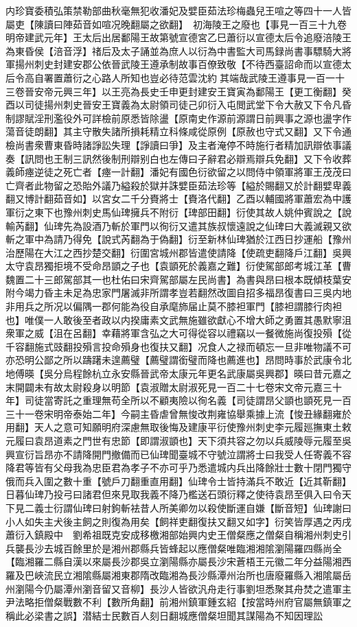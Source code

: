 内珍寶委積弘策禁勒部曲秋毫無犯收潘妃及嬖臣茹法珍梅蟲兒王喧之等四十一人皆屬吏【陳讀曰陣茹音如喧况晚翻屬之欲翻】　初海陵王之廢也【事見一百三十九卷明帝建武元年】王太后出居鄱陽王故第號宣德宮乙巳蕭衍以宣德太后令追廢涪陵王為東昏侯【涪音浮】禇后及太子誦並為庶人以衍為中書監大司馬録尚書事驃騎大將軍揚州刺史封建安郡公依晉武陵王遵承制故事百僚致敬【不待西臺詔命而以宣德太后令高自署置蕭衍之心路人所知也豈必待范雲沈約其端哉武陵王遵事見一百一十三卷晉安帝元興三年】以王亮為長史壬申更封建安王寶寅為鄱陽王【更工衡翻】癸酉以司徒揚州刺史晉安王寶義為太尉領司徒己卯衍入屯閲武堂下令大赦又下令凡昏制謬賦淫刑濫役外可詳檢前原悉皆除盪【原南史作源前源謂日前興事之源也盪字作蕩音徒朗翻】其主守散失諸所損耗精立科條咸從原例【原赦也守式又翻】又下令通檢尚書衆曹東昏時諸諍訟失理【諍讀曰爭】及主者淹停不時施行者精加訊辯依事議奏【訊問也王制三訊然後制刑辯别白也左傳曰子辭君必辯焉辯兵免翻】又下令收葬義師瘞逆徒之死亡者【瘞一計翻】潘妃有國色衍欲留之以問侍中領軍將軍王茂茂曰亡齊者此物留之恐貽外議乃縊殺於獄并誅嬖臣茹法珍等【縊於賜翻又於計翻嬖卑義翻又博計翻茹音如】以宮女二千分賚將士【賚洛代翻】乙酉以輔國將軍蕭宏為中護軍衍之東下也豫州刺史馬仙琕擁兵不附衍【琕部田翻】衍使其故人姚仲賓說之【說輸芮翻】仙琕先為設酒乃斬於軍門以徇衍又遣其族叔懷遠說之仙琕曰大義滅親又欲斬之軍中為請乃得免【說式芮翻為于偽翻】衍至新林仙琕猶於江西日抄運船【豫州治歷陽在大江之西抄楚交翻】衍圍宮城州郡皆遣使請降【使疏吏翻降戶江翻】吳興太守袁昂獨拒境不受命昂顗之子也【袁顗死於義嘉之難】衍使駕部郎考城江革【曹魏置二十三郎駕部其一也杜佑曰宋齊駕部屬左民尚書】為書與昂曰根本既傾枝葉安附今竭力昏主未足為忠家門屠滅非所謂孝豈若翻然改圖自招多福昂復書曰三吳内地非用兵之所况以偏隅一郡何能為役自承麾斾届止莫不膝袒軍門【膝袒謂膝行肉袒也】唯僕一人敢後至者政以内揆庸素文武無施雖欲獻心不增大師之勇置其愚默寧沮衆軍之威【沮在呂翻】幸藉將軍含弘之大可得從容以禮竊以一餐微施尚復投殞【從千容翻施式豉翻投殞言投命殞身也復扶又翻】况食人之禄而頓忘一旦非唯物議不可亦恐明公鄙之所以躊躇未遑薦璧【薦璧謂銜璧而降也薦進也】昂問時事於武康令北地傅暎【吳分烏程餘杭立永安縣晉武帝太康元年更名武康屬吳興郡】暎曰昔元嘉之末開闢未有故太尉殺身以明節【袁淑贈太尉淑死見一百二十七卷宋文帝元嘉三十年】司徒當寄託之重理無苟全所以不顧夷險以徇名義【司徒謂昂父顗也顗死見一百三十一卷宋明帝泰始二年】今嗣主昏虐曾無悛改荆雍協舉乘據上流【悛丑緣翻雍於用翻】天人之意可知願明府深慮無取後悔及建康平衍使豫州刺史李元履廵撫東土敕元履曰袁昂道素之門世有忠節【即謂淑顗也】天下須共容之勿以兵威陵辱元履至吳興宣衍旨昂亦不請降開門撤備而已仙琕聞臺城不守號泣謂將士曰我受人任寄義不容降君等皆有父母我為忠臣君為孝子不亦可乎乃悉遣城内兵出降餘壯士數十閉門獨守俄而兵入圍之數十重【號戶刀翻重直用翻】仙琕令士皆持滿兵不敢近【近其靳翻】日暮仙琕乃投弓曰諸君但來見取我義不降乃檻送石頭衍釋之使待袁昂至俱入曰令天下見二義士衍謂仙琕曰射鉤斬袪昔人所美卿勿以殺使斷運自嫌【斷音短】仙琕謝曰小人如失主犬後主飼之則復為用矣【飼祥吏翻復扶又翻又如字】衍笑皆厚遇之丙戌蕭衍入鎮殿中　劉希祖既克安成移檄湘部始興内史王僧粲應之僧粲自稱湘州刺史引兵襲長沙去城百餘里於是湘州郡縣兵皆蜂起以應僧粲唯臨湘湘隂瀏陽羅四縣尚全【臨湘羅二縣自漢以來屬長沙郡吳立瀏陽縣亦屬長沙宋蒼梧王元徽二年分益陽湘西羅及巴峽流民立湘隂縣屬湘東郡隋改臨湘為長沙縣潭州治所也唐廢羅縣入湘隂屬岳州瀏陽今仍屬潭州瀏音留又音柳】長沙人皆欲汎舟走行事劉坦悉聚其舟焚之遣軍主尹法略拒僧粲戰數不利【數所角翻】前湘州鎮軍鍾玄紹【按當時州府官屬無鎮軍之稱此必梁書之誤】潜結士民數百人刻日翻城應僧粲坦聞其謀陽為不知因理訟